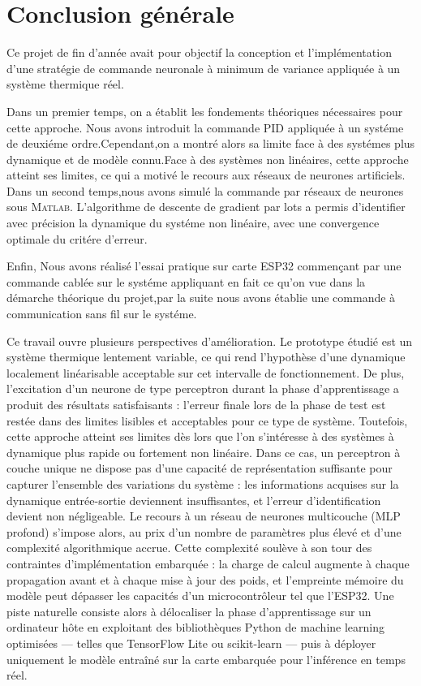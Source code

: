 \chapter*{Conclusion générale}

\vspace{0.5cm}

Ce projet de fin d'année avait pour objectif la conception et
l'implémentation d'une stratégie de commande neuronale à minimum
de variance appliquée à un système thermique réel.

Dans un premier temps, on a établit les fondements théoriques nécessaires pour cette approche. Nous avons introduit la commande PID appliquée à un systéme de deuxiéme ordre.Cependant,on a montré alors sa limite face à des systémes plus dynamique et de modèle connu.Face à des systèmes non linéaires, cette approche atteint ses limites, ce qui a motivé le recours aux
réseaux de neurones artificiels.
Dans un second temps,nous avons simulé la commande par réseaux de neurones sous \textsc{Matlab}. L'algorithme de
descente de gradient par lots a permis d'identifier avec précision la dynamique du systéme non linéaire, avec une convergence optimale du critére d'erreur.

Enfin, Nous avons réalisé l'essai  pratique sur carte ESP32 commençant par une commande cablée sur le systéme appliquant en fait ce qu'on vue dans la démarche théorique du projet,par la suite nous avons établie une commande à communication sans fil sur le systéme.

Ce travail ouvre plusieurs perspectives d'amélioration. Le prototype étudié est un système thermique lentement variable, ce qui rend l'hypothèse d'une dynamique localement linéarisable acceptable sur cet intervalle de fonctionnement. De plus, l'excitation d'un neurone de type perceptron durant la phase d'apprentissage a produit des résultats satisfaisants : l'erreur finale lors de la phase de test est restée dans des limites lisibles et acceptables pour ce type de système.
Toutefois, cette approche atteint ses limites dès lors que l'on s'intéresse à des systèmes à dynamique plus rapide ou fortement non linéaire. Dans ce cas, un perceptron à couche unique ne dispose pas d'une capacité de représentation suffisante pour capturer l'ensemble des variations du système : les informations acquises sur la dynamique entrée-sortie deviennent insuffisantes, et l'erreur d'identification devient non négligeable. Le recours à un réseau de neurones multicouche (MLP profond) s'impose alors, au prix d'un nombre de paramètres plus élevé et d'une complexité algorithmique accrue.
Cette complexité soulève à son tour des contraintes d'implémentation embarquée : la charge de calcul augmente à chaque propagation avant et à chaque mise à jour des poids, et l'empreinte mémoire du modèle peut dépasser les capacités d'un microcontrôleur tel que l'ESP32. Une piste naturelle consiste alors à délocaliser la phase d'apprentissage sur un ordinateur hôte en exploitant des bibliothèques Python de machine learning optimisées — telles que TensorFlow Lite ou scikit-learn — puis à déployer uniquement le modèle entraîné sur la carte embarquée pour l'inférence en temps réel.
